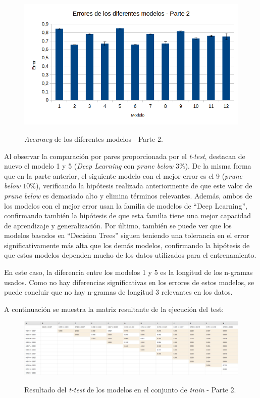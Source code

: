 \documentclass[es]{uc3mreport}
\begin{document}
\begin{report}
    \begin{figure}[H]
        \center
        \includegraphics[width=0.85\linewidth]{errors_train2.png}\\
        \caption{\textit{Accuracy} de los diferentes modelos - Parte 2.}
    \end{figure}

    Al observar la comparación por pares proporcionada por el \textit{t-test},
    destacan de nuevo el modelo 1 y 5 (\textit{Deep Learning}
    con \textit{prune below $3\%$}). De la misma forma que en la parte anterior,
    el siguiente modelo con el mejor error es el 9 (\textit{prune below $10\%$}),
    verificando la hipótesis realizada anteriormente de que este valor de
    \textit{prune below} es demasiado alto y elimina términos relevantes. Además,
    ambos de los modelos con el mejor error usan la familia de modelos de
    ``Deep Learning'', confirmando también la hipótesis de que esta familia tiene
    una mejor capacidad de aprendizaje y generalización. Por último, también se
    puede ver que los modelos basados en ``Decision Trees'' siguen teniendo una
    tolerancia en el error significativamente más alta que los demás modelos,
    confirmando la hipótesis de que estos modelos dependen mucho de los datos
    utilizados para el entrenamiento.

    En este caso, la diferencia entre los modelos 1 y 5 es la longitud de los
    n-gramas usados. Como no hay diferencias significativas en los errores de
    estos modelos, se puede concluir que no hay n-gramas de longitud 3
    relevantes en los datos.

    A continuación se muestra la matriz resultante de la ejecución del test:

    \begin{figure}[H]
        \center
        \includegraphics[width=\linewidth]{t_test2.jpg}\\
        \caption{Resultado del \textit{t-test} de los modelos en el conjunto de
        \textit{train} - Parte 2.}
    \end{figure}


\end{report}
\end{document}
